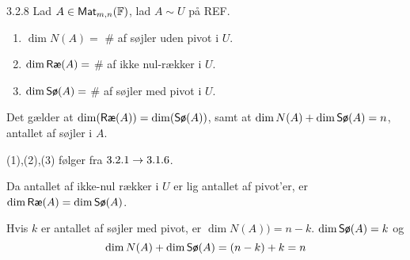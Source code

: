 \begin{proposition}{3.2.8}
	Lad $A\in \mat_{m,n}(\mathbb{F})$, lad $A\sim U$ på REF.
	\begin{enumerate}[(1)]
		\item $\dim N(A) =$ \# af søjler uden pivot i $U$.
		\item $\dim \row{A} =$ \# af ikke nul-rækker i $U$.
		\item $\dim \sor{A} =$ \# af søjler med pivot i $U$.
	\end{enumerate}
	Det gælder at $\dim(\row{A}) = \dim(\sor{A})$, samt at $\dim N(A) + \dim
	\sor{A} = n$, antallet af søjler i $A$.
\end{proposition}

\begin{bevis}
	(1),(2),(3) følger fra $3.2.1 \ra 3.1.6$.

	\noindent
	Da antallet af ikke-nul rækker i $U$ er lig antallet af pivot'er,
	er $\dim\row{A} = \dim\sor{A}$.

	\noindent
	Hvis $k$ er antallet af søjler med pivot, er $\dim N(A)) = n - k$. 
	$\dim \sor{A} = k$ og
	\[
		\dim N(A) + \dim\sor{A} = (n - k) + k = n
	\]
\end{bevis}
